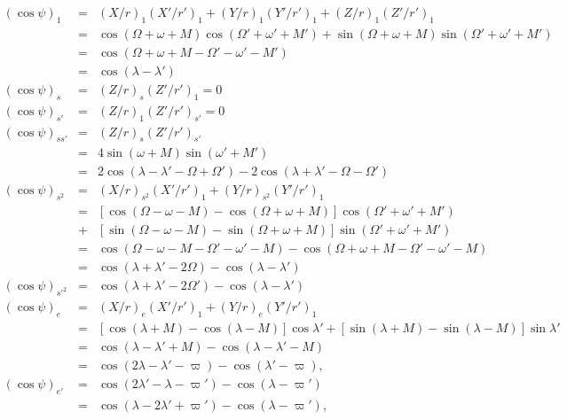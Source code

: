 \documentclass [12pt, a4paper] {article}
\begin{document}
\begin {eqnarray}
    (\cos\psi)_1 
    &=& 
    (X/r)_1(X'/r')_1 + (Y/r)_1(Y'/r')_1 + (Z/r)_1(Z'/r')_1
    \\
    &=& 
    \cos(\Omega + \omega + M)\cos(\Omega' + \omega' + M')
    +
    \sin(\Omega + \omega + M)\sin(\Omega' + \omega' + M')
    \\
    &=& 
    \cos(\Omega + \omega + M - \Omega' - \omega' - M')
    \\
    &=& 
    \cos(\lambda - \lambda')
    \\
    (\cos\psi)_s
    &=&
    (Z/r)_s(Z'/r')_1 = 0
    \\
    (\cos\psi)_{s'}
    &=&
    (Z/r)_1(Z'/r')_{s'} = 0
    \\
    (\cos\psi)_{ss'}
    &=&
    (Z/r)_s(Z'/r')_{s'}
    \\
    &=& 4\sin(\omega + M)\sin(\omega' + M')
    \\
    &=& 
    2\cos(\lambda - \lambda' - \Omega + \Omega') 
    -
    2\cos(\lambda + \lambda' - \Omega - \Omega')
    \\
    (\cos\psi)_{s^2}
    &=&
    (X/r)_{s^2}(X'/r')_1 + (Y/r)_{s^2}(Y'/r')_1
    \\
    &=&
    [\cos(\Omega - \omega - M) - \cos(\Omega + \omega + M)]\cos(\Omega' + \omega' + M')
    \\\nonumber 
    &+&
    [\sin(\Omega - \omega - M) - \sin(\Omega + \omega + M)]\sin(\Omega' + \omega' + M')
    \\
    &=& 
    \cos(\Omega - \omega - M - \Omega' - \omega' - M)
    -
    \cos(\Omega + \omega + M - \Omega' - \omega' - M)
    \\
    &=& 
    \cos(\lambda + \lambda' - 2\Omega) - \cos(\lambda - \lambda')
    \\
    (\cos\psi)_{s'^2} &=& \cos(\lambda + \lambda' - 2\Omega') - \cos(\lambda - \lambda')
    \\
    (\cos\psi)_e &=& (X/r)_{e}(X'/r')_1 + (Y/r)_{e}(Y'/r')_1
    \\
    &=& 
    [\cos(\lambda + M) - \cos(\lambda - M)]\cos\lambda'
    +
    [\sin(\lambda + M) - \sin(\lambda - M)]\sin\lambda'
    \\
    &=& 
    \cos(\lambda - \lambda' + M) - \cos(\lambda - \lambda' - M)
    \\
    &=&
    \cos(2\lambda - \lambda' - \varpi) - \cos(\lambda' - \varpi),
    \\
    (\cos\psi)_{e'}
    &=&
    \cos(2\lambda' - \lambda - \varpi') - \cos(\lambda - \varpi') 
    \\
    &=&
    \cos(\lambda - 2\lambda' + \varpi') - \cos(\lambda - \varpi'),
\end {eqnarray}
\end{document}

